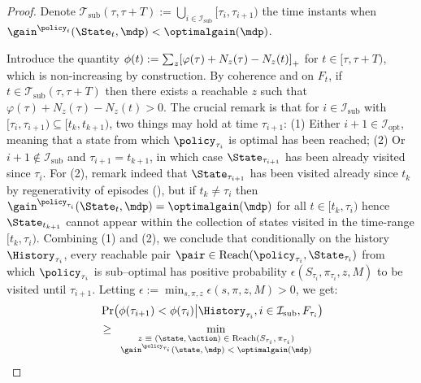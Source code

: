 \documentclass[preprint,cleveref,12pt]{colt2025}
\DeclarePairedDelimiter{\brackets}{[}{]}	%
\DeclarePairedDelimiter{\parens}{(}{)}	%
\def\model{\mdp}
\def\optgain{\optimalgain} %
\def\Reach{\mathrm{Reach}}
\begin{document}
    \begin{proof}
        Denote $\mathcal{T}_\mathrm{sub}(\tau, \tau+T) := \bigcup_{i \in \mathcal{I}_\mathrm{sub}} [\tau_i, \tau_{i+1})$ the time instants when $\gain^{\policy_t}(\State_t, \model) < \optgain(\model)$. 

        Introduce the quantity $\phi(t) := \sum_z \brackets*{\varphi(\tau) + N_z(\tau) - N_z(t)}_+$ for $t \in [\tau, \tau+T)$, which is non-increasing by construction. 
        By coherence and on $F_t$, if $t \in \mathcal{T}_\mathrm{sub}(\tau, \tau+T)$ then there exists a reachable $z$ such that $\varphi(\tau) + N_z(\tau) - N_z(t) > 0$.
        The crucial remark is that for $i \in \mathcal{I}_\mathrm{sub}$ with $[\tau_i, \tau_{i+1}) \subseteq [t_k, t_{k+1})$, two things may hold at time $\tau_{i+1}$:
        (1) Either $i+1 \in \mathcal{I}_\mathrm{opt}$, meaning that a state from which $\policy_{\tau_i}$ is optimal has been reached; 
        (2) Or $i+1 \notin \mathcal{I}_\mathrm{sub}$ and $\tau_{i+1} = t_{k+1}$, in which case $\State_{\tau_{i+1}}$ has been already visited since $\tau_i$.
        For (2), remark indeed that $\State_{\tau_{i+1}}$ has been visited already since $t_k$ by regenerativity of episodes (), but if $t_k \ne \tau_i$ then $\gain^{\policy_{\tau_i}}(\State_t, \model) = \optgain(\model)$ for all $t \in [t_k, \tau_i)$ hence $\State_{t_{k+1}}$ cannot appear within the collection of states visited in the time-range $[t_k, \tau_i)$. 
        Combining (1) and (2), we conclude that conditionally on the history $\History_{\tau_i}$, every reachable pair $\pair \in \Reach(\policy_{\tau_i}, \State_{\tau_i})$ from which $\policy_{\tau_i}$ is sub--optimal has positive probability $\epsilon(S_{\tau_i}, \pi_{\tau_i}, z, M)$ to be visited until $\tau_{i+1}$. 
        Letting $\epsilon := \min_{s, \pi, z} \epsilon(s, \pi, z, M) > 0$, we get:
        \begin{align*}
            &
            \Pr \parens*{
                \phi(\tau_{i+1}) < \phi(\tau_i)
                \middle|
                \History_{\tau_i}, i \in \mathcal{I}_\mathrm{sub}, F_{\tau_i}
            }
            \\
            & \ge 
            \min_{
                \scriptsize
                \begin{array}{c}
                    z \equiv (\state,\action) \in \Reach(S_{\tau_i}, \pi_{\tau_i})
                    \\
                    \gain^{\policy_{\tau_i}}(\state, \model) < \optgain(\model)

\end{array}}
\end{align*}
\end{proof}
\end{document}
